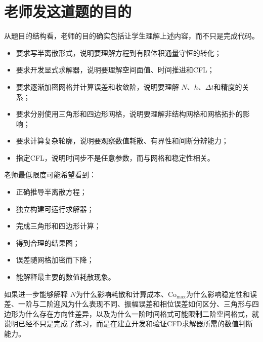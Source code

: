 \documentclass[UTF8,12pt,a4paper,fontset=fandol]{ctexart}
\newcommand{\Cmax}{\mathrm{Co}_{\max}}
\begin{document}
\section{老师发这道题的目的}

从题目的结构看，老师的目的确实包括让学生理解上述内容，而不只是完成代码。

\begin{itemize}
  \item 要求写半离散形式，说明要理解方程到有限体积通量守恒的转化；
  \item 要求开发显式求解器，说明要理解空间面值、时间推进和CFL；
  \item 要求逐渐加密网格并计算误差和收敛阶，说明要理解 $N$、$h$、$\Delta t$和精度的关系；
  \item 要求分别使用三角形和四边形网格，说明要理解非结构网格和网格拓扑的影响；
  \item 要求计算复杂轮廓，说明要观察数值耗散、有界性和间断分辨能力；
  \item 指定CFL，说明时间步不是任意参数，而与网格和稳定性相关。
\end{itemize}

老师最低限度可能希望看到：

\begin{itemize}
  \item 正确推导半离散方程；
  \item 独立构建可运行求解器；
  \item 完成三角形和四边形计算；
  \item 得到合理的结果图；
  \item 误差随网格加密而下降；
  \item 能解释最主要的数值耗散现象。
\end{itemize}

如果进一步能够解释 $N$为什么影响耗散和计算成本、$\Cmax$为什么影响稳定性和误差、一阶与二阶迎风为什么表现不同、振幅误差和相位误差如何区分、三角形与四边形为什么存在方向性差异，以及为什么一阶时间格式可能限制二阶空间格式，就说明已经不只是完成了练习，而是在建立开发和验证CFD求解器所需的数值判断能力。
\end{document}

